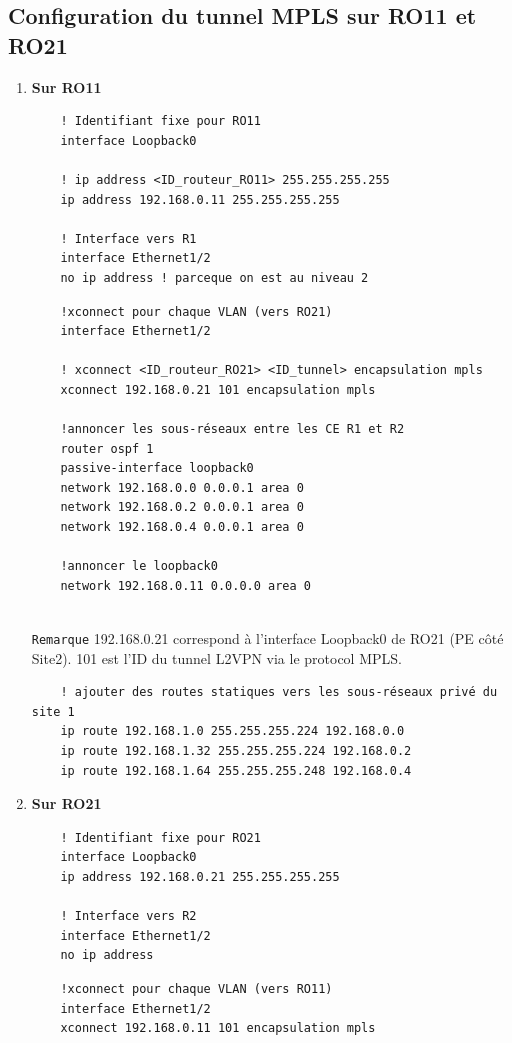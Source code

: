 \documentclass[12pt,a4paper, oneside]{memoir}
\begin{document}
\subsection{Configuration du tunnel MPLS sur RO11 et RO21}
\begin{enumerate}
	\item {\textbf{Sur RO11}}
\begin{verbatim}
	! Identifiant fixe pour RO11
	interface Loopback0
	
	! ip address <ID_routeur_RO11> 255.255.255.255
	ip address 192.168.0.11 255.255.255.255  
	
	! Interface vers R1
	interface Ethernet1/2
	no ip address ! parceque on est au niveau 2
\end{verbatim}

\begin{verbatim}
	!xconnect pour chaque VLAN (vers RO21)
	interface Ethernet1/2
	
	! xconnect <ID_routeur_RO21> <ID_tunnel> encapsulation mpls
	xconnect 192.168.0.21 101 encapsulation mpls 
	
	!annoncer les sous-réseaux entre les CE R1 et R2
	router ospf 1
	passive-interface loopback0
	network 192.168.0.0 0.0.0.1 area 0
	network 192.168.0.2 0.0.0.1 area 0
	network 192.168.0.4 0.0.0.1 area 0
	
	!annoncer le loopback0
	network 192.168.0.11 0.0.0.0 area 0
	
\end{verbatim}

\texttt{Remarque}
192.168.0.21 correspond à l’interface Loopback0 de RO21 (PE côté Site2).
101 est l'ID du tunnel L2VPN via le protocol MPLS.

\begin{verbatim}
	! ajouter des routes statiques vers les sous-réseaux privé du site 1
	ip route 192.168.1.0 255.255.255.224 192.168.0.0
	ip route 192.168.1.32 255.255.255.224 192.168.0.2
	ip route 192.168.1.64 255.255.255.248 192.168.0.4		
\end{verbatim}

\item {\textbf{Sur RO21}}
\begin{verbatim}
	! Identifiant fixe pour RO21
	interface Loopback0
	ip address 192.168.0.21 255.255.255.255
	
	! Interface vers R2
	interface Ethernet1/2
	no ip address
\end{verbatim}

\begin{verbatim}
	!xconnect pour chaque VLAN (vers RO11)
	interface Ethernet1/2
	xconnect 192.168.0.11 101 encapsulation mpls
	

\end{verbatim}
\end{enumerate}
\end{document}
